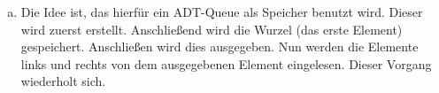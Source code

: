 \documentclass[11pt]{article}
\begin{document}
\begin{enumerate}[a)]
\begin{enumerate}[a.)]
      
      
       
       
      \item
      Die Idee ist, das hierfür ein ADT-Queue als Speicher benutzt wird.
      Dieser wird zuerst erstellt. Anschließend wird die Wurzel 
      (das erste Element) gespeichert. Anschließen wird dies ausgegeben.
      Nun werden die Elemente links und rechts von dem ausgegebenen Element eingelesen. Dieser Vorgang wiederholt sich.
      
          
    \end{enumerate}
     
        
\end{enumerate} 
\end{document}
